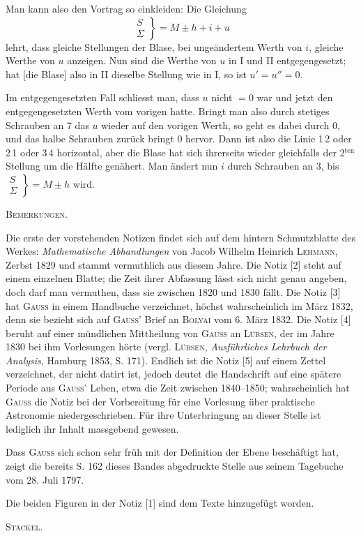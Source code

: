 Man kann also den Vortrag so einkleiden: Die Gleichung
\[
\left.\begin{array}{c} S \\ \Sigma \end{array}\right\} = M\pm h+i+u
\]
lehrt, dass gleiche Stellungen der Blase, bei unge\"andertem Werth von $i$, gleiche Werthe von $u$ anzeigen. Nun sind die Werthe von $u$ in I und II entgegengesetzt; hat [die Blase] also in II dieselbe Stellung wie in I, so ist $u'=u''=0$.

Im entgegengesetzten Fall schliesst man, dass $u$ nicht $=0$ war und jetzt den entgegengesetzten Werth vom vorigen hatte. Bringt man also durch stetiges Schrauben an 7 das $u$ wieder auf den vorigen Werth, so geht es dabei durch 0, und das halbe Schrauben zur\"uck bringt 0 hervor. Dann ist also die Linie 1\,2 oder 2\,1 oder 3\,4 horizontal, aber die Blase hat sich ihrerseits wieder gleichfalls der 2$^{\mathrm{ten}}$ Stellung um die H\"alfte gen\"ahert. Man \"andert nun $i$ durch Schrauben an 3, bis $\left.\substack{S\\\Sigma}\right\} = M\pm h$ wird.

\begin{center}
\textsc{Bemerkungen.}
\end{center}

Die erste der vorstehenden Notizen findet sich auf dem hintern Schmutzblatte des Werkes: \emph{Mathematische Abhandlungen} von Jacob Wilhelm Heinrich \textsc{Lehmann}, Zerbst 1829 und stammt vermuthlich aus diesem Jahre. Die Notiz [2] steht auf einem einzelnen Blatte; die Zeit ihrer Abfassung l\"asst sich nicht genau angeben, doch darf man vermuthen, dass sie zwischen 1820 und 1830 f\"allt. Die Notiz [3] hat \textsc{Gauss} in einem Handbuche verzeichnet, h\"ochst wahrscheinlich im M\"arz 1832, denn sie bezieht sich auf \textsc{Gauss}’ Brief an \textsc{Bolyai} vom 6. M\"arz 1832. Die Notiz [4] beruht auf einer m\"undlichen Mittheilung von \textsc{Gauss} an \textsc{Lübsen}, der im Jahre 1830 bei ihm Vorlesungen h\"orte (vergl. \textsc{Lübsen}, \emph{Ausf\"uhrliches Lehrbuch der Analysis}, Hamburg 1853, S. 171). Endlich ist die Notiz [5] auf einem Zettel verzeichnet, der nicht datirt ist, jedoch deutet die Handschrift auf eine sp\"atere Periode aus \textsc{Gauss}’ Leben, etwa die Zeit zwischen 1840--1850; wahrscheinlich hat \textsc{Gauss} die Notiz bei der Vorbereitung f\"ur eine Vorlesung \"uber praktische Astronomie niedergeschrieben. F\"ur ihre Unterbringung an dieser Stelle ist lediglich ihr Inhalt massgebend gewesen.

Dass \textsc{Gauss} sich schon sehr fr\"uh mit der Definition der Ebene besch\"aftigt hat, zeigt die bereits S. 162 dieses Bandes abgedruckte Stelle aus seinem Tagebuche vom 28. Juli 1797.

Die beiden Figuren in der Notiz [1] sind dem Texte hinzugef\"ugt worden.

\hfill \textsc{Stäckel.}


